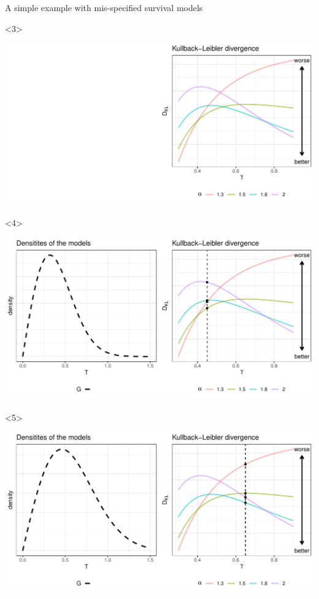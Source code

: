 \documentclass[smaller]{beamer}\usepackage{listings}
\begin{document}
\begin{frame}[label={sec:org529add1}]{A simple example with mis-specified survival models}
\begin{onlyenv}<3>
\begin{center}
\includegraphics[width=.9\linewidth]{fig-mix-const-v3.pdf}
\end{center}
\end{onlyenv}


\begin{onlyenv}<4>
\begin{center}
\includegraphics[width=.9\linewidth]{fig-mix-const-v4.pdf}
\end{center}
\end{onlyenv}

\begin{onlyenv}<5>
\begin{center}
\includegraphics[width=.9\linewidth]{fig-mix-const-v5.pdf}
\end{center}
\end{onlyenv}
\end{frame}
\end{document}
